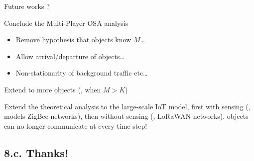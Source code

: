 \documentclass[12pt,english,ignorenonframetext,aspectratio=169,]{beamer}
\begin{document}
\begin{frame}{Future works ?}

\begin{block}{Conclude the Multi-Player OSA analysis}

\begin{itemize}
\item
  Remove hypothesis that objects know \(M\)\ldots
\item
  Allow arrival/departure of objects\ldots
\item
  Non-stationarity of background traffic etc\ldots
\end{itemize}


\end{block}

\begin{block}{Extend to more objects (\ie, when \(M > K\))}

Extend the theoretical analysis to the large-scale IoT model, first
with sensing (\eg, models ZigBee networks), then without sensing (\eg,
LoRaWAN networks).
\hook objects can no longer communicate at every time step!

\end{block}

\end{frame}



\subsection{\hfill{}8.c. Thanks!\hfill{}}
\end{document}
